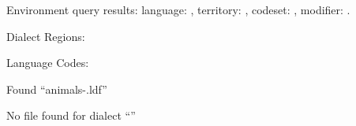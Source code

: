 


\TrackLangFromEnv %
Environment query results:
language: \TrackLangEnvLang, 
territory: \TrackLangEnvTerritory,
codeset: \TrackLangEnvCodeSet,
modifier: \TrackLangEnvModifier.




Dialect Regions:


Language Codes:


\ForEachTrackedDialect{\ThisDialect}
{%
  {Found ``animals-\CurrentTrackedTag.ldf''\par}%
  {No file found for dialect ``\ThisDialect''\par}
}

\bye
